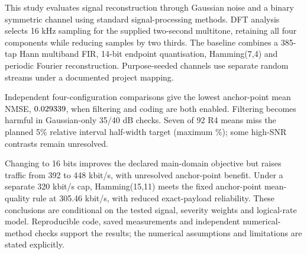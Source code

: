 \begingroup
\normalsize
\begin{flushleft}
\bfseries\abstractname
\end{flushleft}
\noindent
This study evaluates signal reconstruction through Gaussian noise and a
binary symmetric channel using standard signal-processing methods. DFT analysis selects
16 kHz sampling for the supplied two-second multitone, retaining all four
components while reducing samples by two thirds. The baseline combines a
385-tap Hann multiband FIR, 14-bit endpoint quantisation, Hamming(7,4) and
periodic Fourier reconstruction. Purpose-seeded channels use separate
random streams under a documented project mapping.

Independent four-configuration comparisons give the lowest anchor-point
mean NMSE, $0.029339$, when filtering and coding are both enabled.
Filtering becomes harmful in Gaussian-only 35/40 dB checks. Seven of 92
R4 means miss the planned 5\% relative interval half-width target (maximum
\WMaxRelativePercent\%); some high-SNR contrasts remain unresolved.

Changing to 16 bits improves the declared main-domain objective but raises
traffic from 392 to 448 kbit/s, with unresolved anchor-point benefit.
Under a separate 320 kbit/s cap, Hamming(15,11) meets the fixed anchor-point
mean-quality rule at 305.46 kbit/s, with reduced exact-payload reliability.
These conclusions are conditional on the tested signal, severity weights
and logical-rate model. Reproducible code, saved measurements and independent
numerical-method checks support the results; the numerical assumptions and limitations are stated explicitly.
\par
\endgroup
